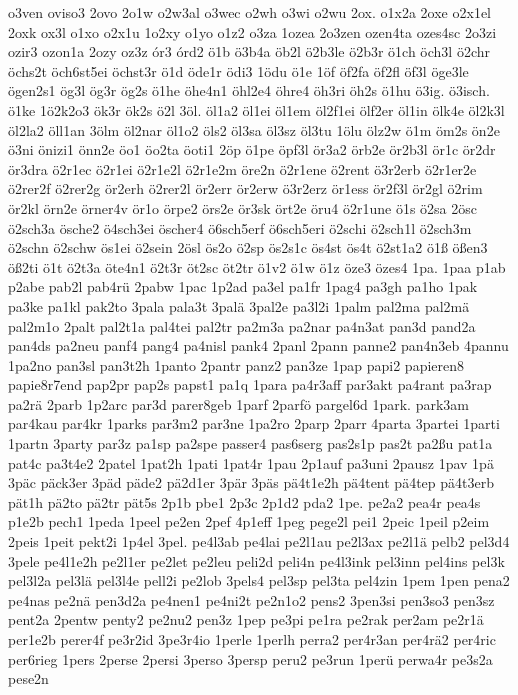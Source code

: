 {o3ven
oviso3
2ovo
2o1w
o2w3al
o3wec
o2wh
o3wi
o2wu
2ox.
o1x2a
2oxe
o2x1el
2oxk
ox3l
o1xo
o2x1u
1o2xy
o1yo
o1z2
o3za
1ozea
2o3zen
ozen4ta
ozes4sc
2o3zi
ozir3
ozon1a
2ozy
oz3z
ór3
órd2
ö1b
ö3b4a
öb2l
ö2b3le
ö2b3r
ö1ch
öch3l
ö2chr
öchs2t
öch6st5ei
öchst3r
ö1d
öde1r
ödi3
1ödu
ö1e
1öf
öf2fa
öf2fl
öf3l
öge3le
ögen2s1
ög3l
ög3r
ög2s
ö1he
öhe4n1
öhl2e4
öhre4
öh3ri
öh2s
ö1hu
ö3ig.
ö3isch.
ö1ke
1ö2k2o3
ök3r
ök2s
ö2l
3öl.
öl1a2
öl1ei
öl1em
öl2f1ei
ölf2er
öl1in
ölk4e
öl2k3l
öl2la2
öll1an
3ölm
öl2nar
öl1o2
öls2
öl3sa
öl3sz
öl3tu
1ölu
ölz2w
ö1m
öm2s
ön2e
ö3ni
önizi1
önn2e
öo1
öo2ta
öoti1
2öp
ö1pe
öpf3l
ör3a2
örb2e
ör2b3l
ör1c
ör2dr
ör3dra
ö2r1ec
ö2r1ei
ö2r1e2l
ö2r1e2m
öre2n
ö2r1ene
ö2rent
ö3r2erb
ö2r1er2e
ö2rer2f
ö2rer2g
ör2erh
ö2rer2l
ör2err
ör2erw
ö3r2erz
ör1ess
ör2f3l
ör2gl
ö2rim
ör2kl
örn2e
örner4v
ör1o
örpe2
örs2e
ör3sk
ört2e
öru4
ö2r1une
ö1s
ö2sa
2ösc
ö2sch3a
ösche2
ö4sch3ei
öscher4
ö6sch5erf
ö6sch5eri
ö2schi
ö2sch1l
ö2sch3m
ö2schn
ö2schw
ös1ei
ö2sein
2ösl
ös2o
ö2sp
ös2s1c
ös4st
ös4t
ö2st1a2
ö1ß
ößen3
öß2ti
ö1t
ö2t3a
öte4n1
ö2t3r
öt2sc
öt2tr
ö1v2
ö1w
ö1z
öze3
özes4
1pa.
1paa
p1ab
p2abe
pab2l
pab4rü
2pabw
1pac
1p2ad
pa3el
pa1fr
1pag4
pa3gh
pa1ho
1pak
pa3ke
pa1kl
pak2to
3pala
pala3t
3palä
3pal2e
pa3l2i
1palm
pal2ma
pal2mä
pal2m1o
2palt
pal2t1a
pal4tei
pal2tr
pa2m3a
pa2nar
pa4n3at
pan3d
pand2a
pan4ds
pa2neu
panf4
pang4
pa4nisl
pank4
2panl
2pann
panne2
pan4n3eb
4pannu
1pa2no
pan3sl
pan3t2h
1panto
2pantr
panz2
pan3ze
1pap
papi2
papieren8
papie8r7end
pap2pr
pap2s
papst1
pa1q
1para
pa4r3aff
par3akt
pa4rant
pa3rap
pa2rä
2parb
1p2arc
par3d
parer8geb
1parf
2parfö
pargel6d
1park.
park3am
par4kau
par4kr
1parks
par3m2
par3ne
1pa2ro
2parp
2parr
4parta
3partei
1parti
1partn
3party
par3z
pa1sp
pa2spe
passer4
pas6serg
pas2s1p
pas2t
pa2ßu
pat1a
pat4c
pa3t4e2
2patel
1pat2h
1pati
1pat4r
1pau
2p1auf
pa3uni
2pausz
1pav
1pä
3päc
päck3er
3päd
päde2
pä2d1er
3pär
3päs
pä4t1e2h
pä4tent
pä4tep
pä4t3erb
pät1h
pä2to
pä2tr
pät5s
2p1b
pbe1
2p3c
2p1d2
pda2
1pe.
pe2a2
pea4r
pea4s
p1e2b
pech1
1peda
1peel
pe2en
2pef
4p1eff
1peg
pege2l
pei1
2peic
1peil
p2eim
2peis
1peit
pekt2i
1p4el
3pel.
pe4l3ab
pe4lai
pe2l1au
pe2l3ax
pe2l1ä
pelb2
pel3d4
3pele
pe4l1e2h
pe2l1er
pe2let
pe2leu
peli2d
peli4n
pe4l3ink
pel3inn
pel4ins
pel3k
pel3l2a
pel3lä
pel3l4e
pell2i
pe2lob
3pels4
pel3sp
pel3ta
pel4zin
1pem
1pen
pena2
pe4nas
pe2nä
pen3d2a
pe4nen1
pe4ni2t
pe2n1o2
pens2
3pen3si
pen3so3
pen3sz
pent2a
2pentw
penty2
pe2nu2
pen3z
1pep
pe3pi
pe1ra
pe2rak
per2am
pe2r1ä
per1e2b
perer4f
pe3r2id
3pe3r4io
1perle
1perlh
perra2
per4r3an
per4rä2
per4ric
per6rieg
1pers
2perse
2persi
3perso
3persp
peru2
pe3run
1perü
perwa4r
pe3s2a
pese2n
}
